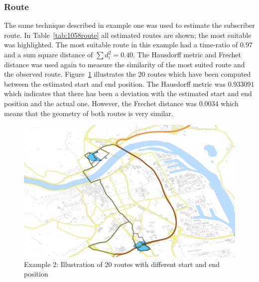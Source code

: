 \subsubsection{Route}
The same technique described in example one was used to estimate the subscriber route. In Table~\ref{tab:1058route} all estimated routes are shown; the most suitable was highlighted. The most suitable route in this example  had a time-ratio of  $0.97$ and a sum square distance of $\sum {d}_{i}^{2}=0.40$. The Hausdorff metric and Frechet distance was used again to measure the similarity of the most suited route and the observed route. Figure~\ref{fig:1058_routes} illustrates the 20 routes which have been computed between the estimated start and end position. The Hausdorff metric was $0.933091$ which indicates that there has been a deviation with the estimated start and end position and the actual one. However, the Frechet distance was  $0.0034$ which means that the geometry of both routes is very similar.
\begin{figure}
\centering
\includegraphics[width=0.7\linewidth]{./images/1058_routes}
\caption{Example 2: Illustration of 20 routes with different start and end position}
\label{fig:1058_routes}
\end{figure}

